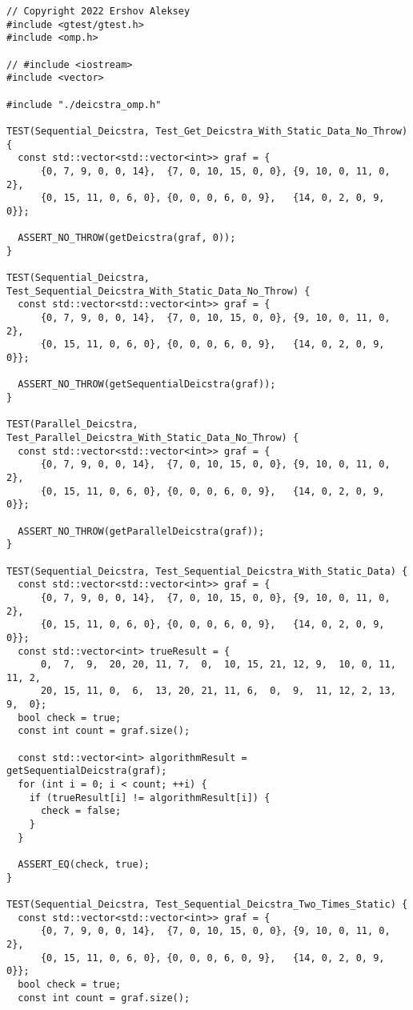 \documentclass{report}
\begin{document}
\begin{lstlisting}
// Copyright 2022 Ershov Aleksey
#include <gtest/gtest.h>
#include <omp.h>

// #include <iostream>
#include <vector>

#include "./deicstra_omp.h"

TEST(Sequential_Deicstra, Test_Get_Deicstra_With_Static_Data_No_Throw) {
  const std::vector<std::vector<int>> graf = {
      {0, 7, 9, 0, 0, 14},  {7, 0, 10, 15, 0, 0}, {9, 10, 0, 11, 0, 2},
      {0, 15, 11, 0, 6, 0}, {0, 0, 0, 6, 0, 9},   {14, 0, 2, 0, 9, 0}};

  ASSERT_NO_THROW(getDeicstra(graf, 0));
}

TEST(Sequential_Deicstra, Test_Sequential_Deicstra_With_Static_Data_No_Throw) {
  const std::vector<std::vector<int>> graf = {
      {0, 7, 9, 0, 0, 14},  {7, 0, 10, 15, 0, 0}, {9, 10, 0, 11, 0, 2},
      {0, 15, 11, 0, 6, 0}, {0, 0, 0, 6, 0, 9},   {14, 0, 2, 0, 9, 0}};

  ASSERT_NO_THROW(getSequentialDeicstra(graf));
}

TEST(Parallel_Deicstra, Test_Parallel_Deicstra_With_Static_Data_No_Throw) {
  const std::vector<std::vector<int>> graf = {
      {0, 7, 9, 0, 0, 14},  {7, 0, 10, 15, 0, 0}, {9, 10, 0, 11, 0, 2},
      {0, 15, 11, 0, 6, 0}, {0, 0, 0, 6, 0, 9},   {14, 0, 2, 0, 9, 0}};

  ASSERT_NO_THROW(getParallelDeicstra(graf));
}

TEST(Sequential_Deicstra, Test_Sequential_Deicstra_With_Static_Data) {
  const std::vector<std::vector<int>> graf = {
      {0, 7, 9, 0, 0, 14},  {7, 0, 10, 15, 0, 0}, {9, 10, 0, 11, 0, 2},
      {0, 15, 11, 0, 6, 0}, {0, 0, 0, 6, 0, 9},   {14, 0, 2, 0, 9, 0}};
  const std::vector<int> trueResult = {
      0,  7,  9,  20, 20, 11, 7,  0,  10, 15, 21, 12, 9,  10, 0, 11, 11, 2,
      20, 15, 11, 0,  6,  13, 20, 21, 11, 6,  0,  9,  11, 12, 2, 13, 9,  0};
  bool check = true;
  const int count = graf.size();

  const std::vector<int> algorithmResult = getSequentialDeicstra(graf);
  for (int i = 0; i < count; ++i) {
    if (trueResult[i] != algorithmResult[i]) {
      check = false;
    }
  }

  ASSERT_EQ(check, true);
}

TEST(Sequential_Deicstra, Test_Sequential_Deicstra_Two_Times_Static) {
  const std::vector<std::vector<int>> graf = {
      {0, 7, 9, 0, 0, 14},  {7, 0, 10, 15, 0, 0}, {9, 10, 0, 11, 0, 2},
      {0, 15, 11, 0, 6, 0}, {0, 0, 0, 6, 0, 9},   {14, 0, 2, 0, 9, 0}};
  bool check = true;
  const int count = graf.size();


\end{lstlisting}
\end{document}
